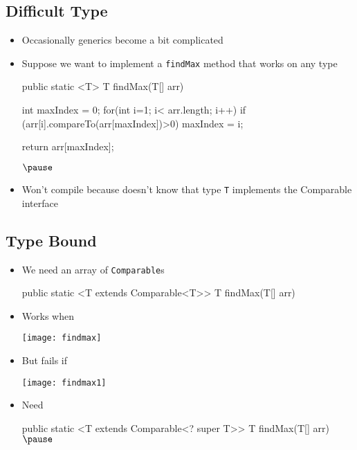 
\begin{slide}
\section[-1]{Difficult Type}

\begin{PauseHighLight}
  \begin{itemize}
  \item Occasionally generics become a bit complicated\pause
  \item Suppose we want to implement a \texttt{findMax} method that works on
    any type
\begin{java}
    public static <T> T findMax(T[] arr)
    {
        int maxIndex = 0;
        for(int i=1; i< arr.length; i++)
            if (arr[i].compareTo(arr[maxIndex])>0)
                maxIndex = i;

        return arr[maxIndex];
    }$\pause$      
\end{java}
  \item Won't compile because doesn't know that type \texttt{T}
  implements the Comparable interface\pause
  \end{itemize}
\end{PauseHighLight}

\end{slide}


\begin{slide}
\section[-1]{Type Bound}

\begin{PauseHighLight}
  \begin{itemize}
  \item We need an array of \texttt{Comparable}s
\begin{java}
public static <T extends Comparable<T>> T findMax(T[] arr)
\end{java}\pause\vspace*{-3ex}
\item Works when
  \begin{center}
    \texttt{[image: findmax]}\pause
  \end{center}\vspace*{-2ex}
\item But fails if
  \begin{center}
    \texttt{[image: findmax1]}\pause
  \end{center}\vspace*{-2ex}
\item Need
\begin{java}
public static <T extends Comparable<? super T>> T findMax(T[] arr)$\pause$
\end{java}
  \end{itemize}
\end{PauseHighLight}

\end{slide}

